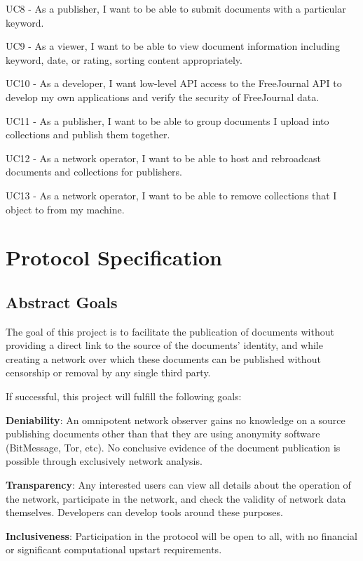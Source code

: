 \documentclass[letterpaper,10pt,oneside]{sphinxmanual}
\begin{document}
UC8 - As a publisher, I want to be able to submit documents with a particular keyword.

UC9 - As a viewer, I want to be able to view document information including keyword, date, or rating, sorting content appropriately.

UC10 - As a developer, I want low-level API access to the FreeJournal API to develop my own applications and verify the security of FreeJournal data.

UC11 - As a publisher, I want to be able to group documents I upload into collections and publish them together.

UC12 - As a network operator, I want to be able to host and rebroadcast documents and collections for publishers.

UC13 - As a network operator, I want to be able to remove collections that I object to from my machine.


\chapter{Protocol Specification}
\label{protocol:protocol-specification}\label{protocol::doc}

\section{Abstract Goals}
\label{protocol:abstract-goals}
The goal of this project is to facilitate the publication of documents without providing a direct link to the source of the documents' identity, and while creating a network over which these documents can be published without censorship or removal by any single third party.

If successful, this project will fulfill the following goals:

\textbf{Deniability}: An omnipotent network observer gains no knowledge on a source publishing documents other than that they are
using anonymity software (BitMessage, Tor, etc).  No conclusive evidence of the document publication is possible through
exclusively network analysis.

\textbf{Transparency}: Any interested users can view all details about the operation of the network, participate in the network,
and check the validity of network data themselves.  Developers can develop tools around these purposes.

\textbf{Inclusiveness}: Participation in the protocol will be open to all, with no financial or significant computational upstart
requirements.
\end{document}

